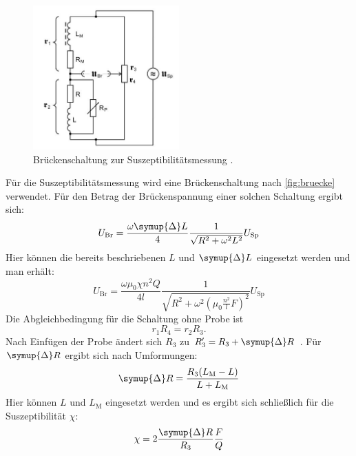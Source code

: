 \begin{figure}[H]
    \centering
    \includegraphics[width=0.5\textwidth]{content/bruecke.JPG}
    \caption{Brückenschaltung zur Suszeptibilitätsmessung \cite{versuchsanleitung}.}
    \label{fig:bruecke}
  \end{figure}
\noindent Für die Suszeptibilitätsmessung wird eine Brückenschaltung nach \autoref{fig:bruecke} verwendet. Für den Betrag der Brückenspannung einer solchen Schaltung ergibt sich:
\begin{equation}
U_\text{Br} = \frac{\omega \symup{\Delta} L}{4} \frac{1}{\sqrt{R^2 + {\omega}^2 L^2 }} U_\text{Sp}
\end{equation}
Hier können die bereits beschriebenen $L$  und $\symup{\Delta} L$ eingesetzt werden und man erhält:
\begin{equation}
U_\text{Br} = \frac{\omega \mu_0 \chi n^2 Q}{4l} \frac{1}{\sqrt{R^2 + {\omega}^2(\mu_0 \frac{n^2}{l}F)^2}} U_\text{Sp}
\end{equation}
Die Abgleichbedingung für die Schaltung ohne Probe ist
\begin{equation}
    r_1 R_4 = r_2 R_3 .
\end{equation}
Nach Einfügen der Probe ändert sich $R_3$ zu $R'_3 = R_3 + \symup{\Delta}R$ .
Für $\symup{\Delta}R$ ergibt sich nach Umformungen:
\begin{equation}
    \symup{\Delta}R = \frac{R_3 (L_\text{M} - L)}{L + L_\text{M}} 
\end{equation}
Hier können $L$ und $L_\text{M}$ eingesetzt werden und es ergibt sich schließlich für die Suszeptibilität $\chi$:
\begin{equation}
    \label{eqn:chi}
    \chi = 2 \frac{\symup{\Delta}R}{R_3} \frac{F}{Q}
\end{equation}

